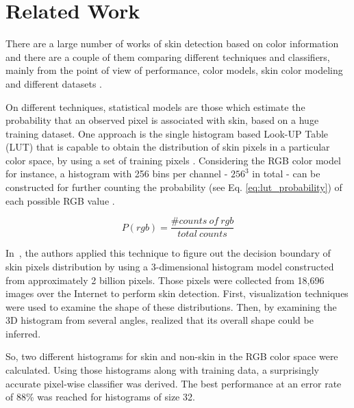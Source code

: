 \chapter{Related Work}
\label{cap:related-work}

There are a large number of works of skin detection based on color information and there are a couple of them comparing different techniques and classifiers, mainly from the point of view of performance, color models, skin color modeling and different datasets \citep{vezhnevets:03,kakumanu:07,mahmoodi:16}.

On different techniques, statistical models are those which estimate the probability that an observed pixel is associated with skin, based on a huge training dataset. One approach is the single histogram based Look-UP Table (LUT) that is capable to obtain the distribution of skin pixels in a particular color space, by using a set of training pixels \citep{mahmoodi:16}. Considering the RGB color model for instance, a histogram with 256 bins per channel - $256^3$ in total - can be constructed for further counting the probability (see Eq. \ref{eq:lut_probability}) of each possible RGB value \citep{jones:02}.

\begin{equation*}
    P(rgb) = \frac{\# counts~of~rgb}{total~counts}
    \label{eq:lut_probability}
\end{equation*}

In~\citet{jones:02}, the authors applied this technique to figure out the decision boundary of skin pixels distribution by using a $3$-dimensional histogram model constructed from approximately 2 billion pixels. Those pixels were collected from 18,696 images over the Internet to perform skin detection. First, visualization techniques were used to examine the shape of these distributions. Then, by examining the 3D histogram from several angles, \citet{jones:02} realized that its overall shape could be inferred.

So, two different histograms for skin and non-skin in the RGB color space were calculated. Using those histograms along with training data, a surprisingly accurate pixel-wise classifier was derived. The best performance at an error rate of 88\% was reached for histograms of size 32.

